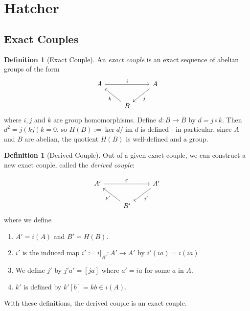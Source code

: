 \documentclass[reqno]{amsart}
\theoremstyle{definition}
\newtheorem{definition}[theorem]{Definition}
\theoremstyle{remark}
\DeclareMathOperator{\im}{im}
\begin{document}
\section{Hatcher}








\subsection{Exact Couples}

\begin{definition}[Exact Couple]
    An \textit{exact couple} is an exact sequence of
    abelian groups of the form
    \begin{equation*}
    \begin{tikzcd}
        A \ar[rr, "i"] & & A \ar[dl, "j"] \\
                       & B \ar[ul, "k"] &
    \end{tikzcd}
    \end{equation*}
    where $i,j$ and $k$ are group homomorphisms. Define
    $d \colon B \to B$ by $d = j \circ k$.
    Then $d^2 = j (kj)k = 0$, so
    $H(B) := \ker d / \im d$ is defined - in particular,
    since $A$ and $B$ are abelian, the quotient
    $H(B)$ is well-defined and a group.
\end{definition}

\begin{definition}[Derived Couple]
    Out of a given exact couple, we can construct
    a new exact couple, called the \textit{derived couple}:

    \begin{equation*}
    \begin{tikzcd}
        A' \ar[rr, "i'"] & & A' \ar[dl, "j'"] \\
                       & B' \ar[ul, "k'"] &
    \end{tikzcd}
    \end{equation*}
    where we define
    \begin{enumerate}
        \item $A' = i(A)$ and $B' = H(B)$.
        \item $i'$ is the induced
            map $i' := i|_{A'} \colon
            A'\to A'$ by $i' (ia) = i(ia)$ 
        \item We define $j'$ by
            $j' a' = \left[ ja \right] $ where
            $a' = ia$ for some $a$ in $A$.
        \item $k'$ is defined by
            $k' \left[ b \right] = kb \in i(A)$.
    \end{enumerate}
    With these definitions, the derived couple is an exact
    couple.
\end{definition}
\end{document}
